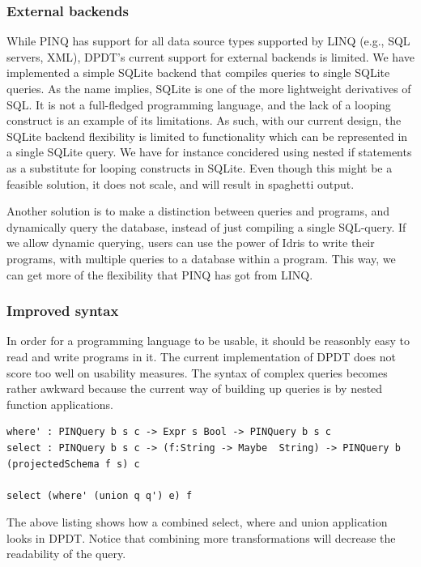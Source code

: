\documentclass[12pt]{article}
\begin{document}
\subsubsection{External backends}

While PINQ has support for all data source types supported by LINQ (e.g., SQL servers, XML), DPDT's current support for external backends is limited.
We have implemented a simple SQLite backend that compiles queries to single SQLite queries.
As the name implies, SQLite is one of the more lightweight derivatives of SQL.
It is not a full-fledged programming language, and the lack of a looping construct is an example of its limitations.
As such, with our current design, the SQLite backend flexibility is limited to functionality which can be represented in a single SQLite query.
We have for instance concidered using nested if statements as a substitute for looping constructs in SQLite.
Even though this might be a feasible solution, it does not scale, and will result in spaghetti output.

Another solution is to make a distinction between queries and programs, and dynamically query the database, instead of just compiling a single SQL-query.
If we allow dynamic querying, users can use the power of Idris to write their programs, with multiple queries to a database within a program.
This way, we can get more of the flexibility that PINQ has got from LINQ. 

\subsubsection{Improved syntax}

In order for a programming language to be usable, it should be reasonbly easy to read and write programs in it.
The current implementation of DPDT does not score too well on usability measures.
The syntax of complex queries becomes rather awkward because the current way of building up queries is by nested function applications.

\begin{lstlisting}
where' : PINQuery b s c -> Expr s Bool -> PINQuery b s c
select : PINQuery b s c -> (f:String -> Maybe  String) -> PINQuery b (projectedSchema f s) c

select (where' (union q q') e) f
\end{lstlisting}

The above listing shows how a combined select, where and union application looks in DPDT.
Notice that combining more transformations will decrease the readability of the query.
\end{document}
